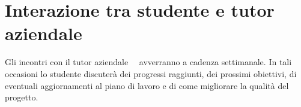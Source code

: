 \section*{Interazione tra studente e tutor aziendale}
Gli incontri con il tutor aziendale \nomeTutorAziendale\ \cognomeTutorAziendale\ avverranno a cadenza settimanale. In tali occasioni lo studente discuterà dei progressi raggiunti, dei prossimi obiettivi, di eventuali aggiornamenti al piano di lavoro e di come migliorare la qualità del progetto.